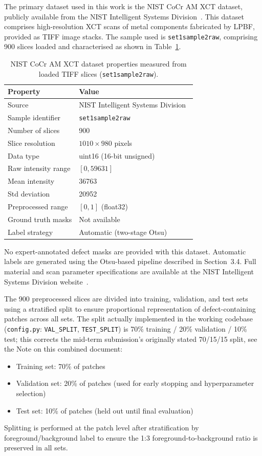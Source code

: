 The primary dataset used in this work is the NIST CoCr AM XCT dataset, publicly available from the
NIST Intelligent Systems Division~\citep{NIST_CoCr}. This dataset comprises high-resolution XCT scans
of metal components fabricated by LPBF, provided as TIFF image stacks. The sample used is
\texttt{set1sample2raw}, comprising 900 slices loaded and characterised as shown in
Table~\ref{tab:nist_properties}.

\begin{table}[htbp]
\centering
\caption{NIST CoCr AM XCT dataset properties measured from loaded TIFF slices
  (\texttt{set1sample2raw}).}
\label{tab:nist_properties}
\begin{tabular}{ll}
\toprule
\textbf{Property} & \textbf{Value} \\
\midrule
Source & NIST Intelligent Systems Division~\citep{NIST_CoCr} \\
Sample identifier & \texttt{set1sample2raw} \\
Number of slices & 900 \\
Slice resolution & $1010 \times 980$ pixels \\
Data type & uint16 (16-bit unsigned) \\
Raw intensity range & $[0, 59631]$ \\
Mean intensity & 36763 \\
Std deviation & 20952 \\
Preprocessed range & $[0, 1]$ (float32) \\
Ground truth masks & Not available \\
Label strategy & Automatic (two-stage Otsu) \\
\bottomrule
\end{tabular}
\end{table}

No expert-annotated defect masks are provided with this dataset. Automatic labels are generated using
the Otsu-based pipeline described in Section~3.4. Full material and scan parameter specifications are
available at the NIST Intelligent Systems Division website~\citep{NIST_CoCr}.

The 900 preprocessed slices are divided into training, validation, and test sets using a stratified
split to ensure proportional representation of defect-containing patches across all sets. The split
actually implemented in the working codebase (\texttt{config.py}: \texttt{VAL\_SPLIT},
\texttt{TEST\_SPLIT}) is 70\% training / 20\% validation / 10\% test; this corrects the mid-term
submission's originally stated 70/15/15 split, see the Note on this combined document:
\begin{itemize}
\item Training set: 70\% of patches
\item Validation set: 20\% of patches (used for early stopping and hyperparameter selection)
\item Test set: 10\% of patches (held out until final evaluation)
\end{itemize}
Splitting is performed at the patch level after stratification by foreground/background label to
ensure the 1:3 foreground-to-background ratio is preserved in all sets.

